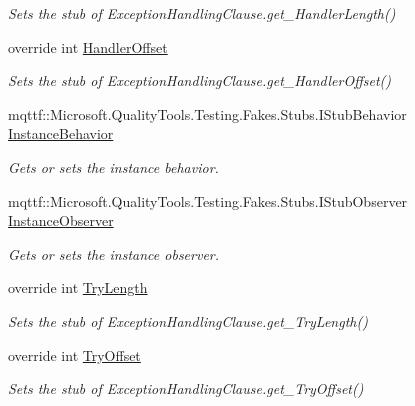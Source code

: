 \begin{DoxyCompactItemize}
\begin{DoxyCompactList}\small\item\em Sets the stub of Exception\-Handling\-Clause.\-get\-\_\-\-Handler\-Length()\end{DoxyCompactList}\item 
override int \hyperlink{class_system_1_1_reflection_1_1_fakes_1_1_stub_exception_handling_clause_af840af00c63b73f6ae8cb8933c150436}{Handler\-Offset}
\begin{DoxyCompactList}\small\item\em Sets the stub of Exception\-Handling\-Clause.\-get\-\_\-\-Handler\-Offset()\end{DoxyCompactList}\item 
mqttf\-::\-Microsoft.\-Quality\-Tools.\-Testing.\-Fakes.\-Stubs.\-I\-Stub\-Behavior \hyperlink{class_system_1_1_reflection_1_1_fakes_1_1_stub_exception_handling_clause_a9ff3fe5aa6c71ffd1d3607d0f47cfe8f}{Instance\-Behavior}
\begin{DoxyCompactList}\small\item\em Gets or sets the instance behavior.\end{DoxyCompactList}\item 
mqttf\-::\-Microsoft.\-Quality\-Tools.\-Testing.\-Fakes.\-Stubs.\-I\-Stub\-Observer \hyperlink{class_system_1_1_reflection_1_1_fakes_1_1_stub_exception_handling_clause_a3ffa2e3e8ea0661cc0ba24716f8a2cab}{Instance\-Observer}
\begin{DoxyCompactList}\small\item\em Gets or sets the instance observer.\end{DoxyCompactList}\item 
override int \hyperlink{class_system_1_1_reflection_1_1_fakes_1_1_stub_exception_handling_clause_a8a6846bf128bb721f04bd00a191d248e}{Try\-Length}
\begin{DoxyCompactList}\small\item\em Sets the stub of Exception\-Handling\-Clause.\-get\-\_\-\-Try\-Length()\end{DoxyCompactList}\item 
override int \hyperlink{class_system_1_1_reflection_1_1_fakes_1_1_stub_exception_handling_clause_a57f625f62cc0bb14a53035961d1fd72b}{Try\-Offset}
\begin{DoxyCompactList}\small\item\em Sets the stub of Exception\-Handling\-Clause.\-get\-\_\-\-Try\-Offset()\end{DoxyCompactList}\end{DoxyCompactItemize}


